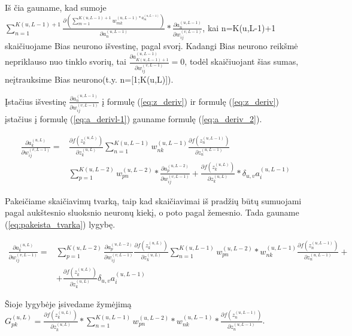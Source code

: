 Iš čia gauname, kad sumoje $\sum_{n=1}^{K(u, L-1)+1} \frac{\partial (\sum_{m=1}^{K(u,L-1)+1} w_{mk}^{(u,L-1) * a_m^{(u,L-1)}} )}{\partial a_n^{(u,L-1)}} *
\frac{\partial a_n^{(u,L-1)}}{\partial w_{ij}^{(v,L-1)}}$, kai n=K(u,L-1)+1 skaičiuojame Bias neurono išvestinę, pagal svorį. Kadangi Bias neurono reikšmė nepriklauso nuo tinklo svorių, tai $\frac{\partial a_{K(u,L-1)+1}^{(u,L-1)}}{\partial w_{ij}^{(v,L-1)}} = 0$, todėl skaičiuojant šias sumas, neįtrauksime Bias neurono(t.y. n=[1;K(u,L)]).

Įstačius išvestinę $\frac{\partial a_n^{(u,L-1)}}{\partial w_{ij}^{(v,L-1)}}$ į formulę (\ref{eq:z_deriv}) ir formulę (\ref{eq:z_deriv}) įstačius į formulę (\ref{eq:a_derivl-1}) gauname formulę (\ref{eq:a_deriv_2}).


\begin{equation} \label{eq:a_deriv_2}
  \begin{aligned}
    \frac{\partial a_k^{(u, L)}}{\partial w_{ij}^{(v,L-1)}} = &
      \frac{\partial f(z_k^{(u, L)})}{\partial z_k^{(u,L)}}\sum_{n=1}^{K(u, L-1)} w_{nk}^{(u,L-1)} \frac{\partial f(z_n^{(u, L-1)})}{\partial z_n^{(u,L-1)}} \\
    &\sum_{p=1}^{K(u, L-2)} w_{pn}^{(u,L-2)} *
    \frac{\partial a_p^{(u,L-2)}}{\partial w_{ij}^{(v,L-1)}} +
    \frac{\partial f(z_k^{(u, L)})}{\partial z_k^{(u,L)}} * \delta_{u,v}a_i^{(u,L-1)}
  \end{aligned}
\end{equation}

  Pakeičiame skaičiavimų tvarką, taip kad skaičiavimai iš pradžių būtų sumuojami pagal aukštesnio sluoksnio neuronų kiekį, o poto pagal žemesnio. Tada gauname (\ref{eq:pakeista_tvarka}) lygybę.



\begin{equation}\label{eq:pakeista_tvarka}
    \begin{aligned}
      \frac{\partial a_k^{(u, L)}}{\partial w_{ij}^{(v,L-1)}} = &
        \sum_{p=1}^{K(u, L-2)}
        \frac{\partial a_p^{(u,L-2)}}{\partial w_{ij}^{(v,L-1)}}\frac{\partial f(z_k^{(u, L)})}{\partial z_k^{(u,L)}}  \sum_{n=1}^{K(u, L-1)} w_{pn}^{(u,L-2)} * w_{nk}^{(u,L-1)}\frac{\partial f(z_n^{(u, L-1)})}{\partial z_n^{(u,L-1)}} + \\
      & + \frac{\partial f(z_k^{(u, L)})}{\partial z_k^{(u,L)}} \delta_{u,v}a_i^{(u,L-1)}
   \end{aligned}
\end{equation}

Šioje lygybėje įsivedame žymėjimą $G_{pk}^{(u,L)} =
\frac{\partial f(z_k^{(u, L)})}{\partial z_k^{(u,L)}}
*
\sum_{n=1}^{K(u, L-1)} w_{pn}^{(u,L-2)} * w_{nk}^{(u,L-1)} * \frac{\partial f(z_n^{(u, L-1)})}{\partial z_n^{(u,L-1)}}$.

